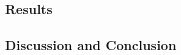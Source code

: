         \subsection{Results} \label{feasibility_of_neural_network_based_data_driven_surrogate_signal_extraction_methods_for_dynamic_pet_results}
            \blindtext
            
        \subsection{Discussion and Conclusion} \label{feasibility_of_neural_network_based_data_driven_surrogate_signal_extraction_methods_for_dynamic_pet_discussion_and_conclusion}
            \blindtext
